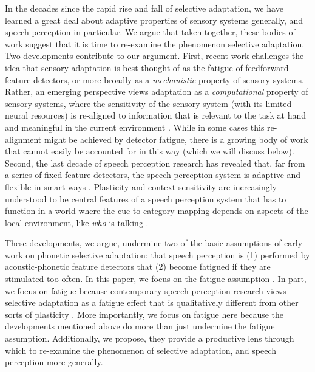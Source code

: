 In the decades since the rapid rise and fall of selective adaptation, we have learned a great deal about adaptive properties of sensory systems generally, and speech perception in particular.  We argue that taken together, these bodies of work suggest that it is time to re-examine the phenomenon selective adaptation.
Two developments contribute to our argument. 
First, recent work challenges the idea that sensory adaptation is best thought of as the fatigue of feedforward feature detectors, or more broadly as a \emph{mechanistic} property of sensory systems. Rather, an emerging perspective views adaptation as a \emph{computational} property of sensory systems, where the sensitivity of the sensory system (with its limited neural resources) is re-aligned to information that is relevant to the task at hand and meaningful in the current environment \cite[e.g.,][]{Gutnisky2008,Kohn2007,Stocker2006,Webster2005}.  While in some cases this re-alignment might be achieved by detector fatigue, there is a growing body of work that cannot easily be accounted for in this way (which we will discuss below).  Second, the last decade of speech perception research has revealed that, far from a series of fixed feature detectors, the speech perception system is adaptive and flexible in smart ways \cite[e.g.,][]{Bertelson2003,Bradlow2008,Clayards2008,Kraljic2008a,Maye2008a,Norris2003}.  Plasticity and context-sensitivity are increasingly understood to be central features of a speech perception system that has to function in a world where the cue-to-category mapping depends on aspects of the local environment, like \emph{who} is talking \cite{Norris2003,Huang2012,Laing2012}.

These developments, we argue, undermine two of the basic assumptions of early work on phonetic selective adaptation: that speech perception is (1) performed by acoustic-phonetic feature detectors that (2) become fatigued if they are stimulated too often.  
\label{r-fd2} In this paper, we focus on the fatigue assumption \autocite[see ][ for a rejection of the feature detector assumption]{Remez1987}.  In part, we focus on fatigue because contemporary speech perception research views selective adaptation as a fatigue effect that is qualitatively different from other sorts of plasticity \autocite[e.g., ][]{Grabski2013,Vroomen2004,Vroomen2007,VanderZande2014,Zaske2013}.
More importantly, we focus on fatigue here because the developments mentioned above do more than just undermine the fatigue assumption.  Additionally, we propose, they provide a productive lens through which to re-examine the phenomenon of selective adaptation, and speech perception more generally.

